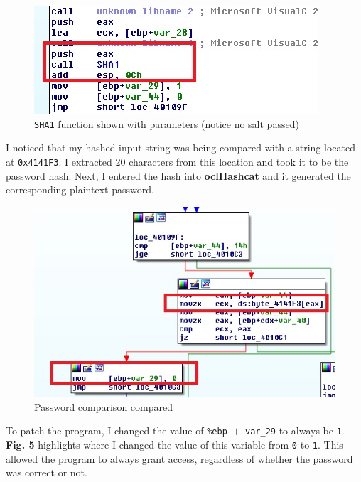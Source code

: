 \documentclass[conference]{IEEEtran}
\begin{document}
\begin{figure}[h]
\includegraphics[width=\columnwidth]{image4.jpg}
\caption{\texttt{SHA1} function shown with parameters (notice no salt passed)}
\centering
\end{figure}\mbox{}

I noticed that my hashed input string was being compared with a string located at \texttt{0x4141F3}. I extracted 20 characters from this location and took it to be the password hash. Next, I entered the hash into \textbf{oclHashcat} and it generated the corresponding plaintext password.\\

\begin{figure}[h]
\includegraphics[width=\columnwidth]{image5.jpg}
\caption{Password comparison compared }
\centering
\end{figure}\mbox{}

To patch the program, I changed the value of \texttt{\%ebp $+$ var\_29} to always be \texttt{1}. \textbf{Fig. 5} highlights where I changed the value of this variable from \texttt{0} to \texttt{1}. This allowed the program to always grant access, regardless of whether the password was correct or not.\\
\end{document}
